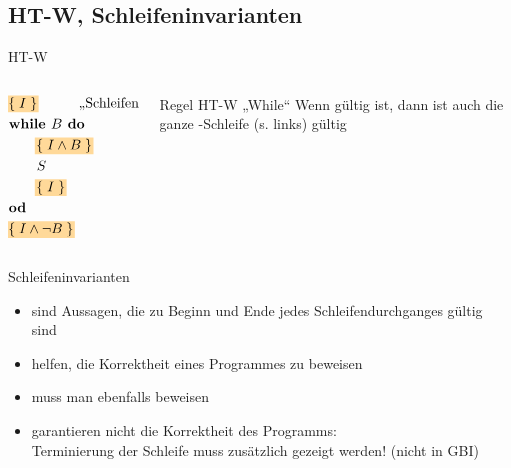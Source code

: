 \subsection{HT-W, Schleifeninvarianten}
\begin{frame}{HT-W}
	\begin{columns}[T] 
		\begin{column}[T]{.4\textwidth} 
			\vspace{-2\baselineskip}
			\begin{align*}
			&\assert{I} \q3uad \text{„Schleifeninvariante“} \\
			&\kw{while } B \kw{ do } \\
			&\qquad \assert{I \land B} \\
			&\qquad S \\
			&\qquad \assert{I} \\
			&\kw{od} \\
			&\assert{I \land \lnot B}
			\end{align*}
			\vspace{-1\baselineskip}
		\end{column}
		\begin{column}[T]{.4\textwidth} 
			\begin{block}{Regel HT-W \quad „While“}
				Wenn  gültig ist, dann ist auch die ganze -Schleife (s. links) gültig
			\end{block}
		\end{column}
	\end{columns}
	
	\pause
	\begin{block}{Schleifeninvarianten}
		\begin{itemize}
			\item sind Aussagen, die zu Beginn und Ende jedes Schleifendurchganges gültig sind
			\item helfen, die Korrektheit eines Programmes zu beweisen
			\item muss man ebenfalls beweisen 
			\item garantieren nicht die Korrektheit des Programms:\pause \\
			 Terminierung der Schleife muss zusätzlich gezeigt werden! (nicht in GBI)
		\end{itemize}
	\end{block}
\end{frame}
	
